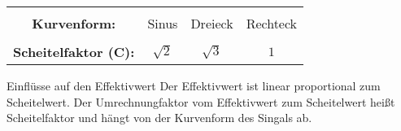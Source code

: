 \begin{frame}
{        \begin{table}[H]
            \centering%
        \begin{tabular}{ c c c c }
            \hline &&&\\[-6pt]
            \textbf{Kurvenform:}
                & Sinus
                & Dreieck
                & Rechteck \\[+4pt]
            \hline &&&\\[-6pt]
            \textbf{Scheitelfaktor (C):}
                & $ \sqrt{2} $ 
                & $ \sqrt{3} $     
                & $ 1 $ \\[+4pt]
            \hline
        \end{tabular}
        \end{table}
    }


\end{frame}


\begin{frame}

    \begin{Merksatz}{Einflüsse auf den Effektivwert}
        Der Effektivwert ist linear proportional zum Scheitelwert. Der Umrechnungfaktor vom Effektivwert zum Scheitelwert 
        heißt Scheitelfaktor und hängt von der Kurvenform des Singals ab. 
    \end{Merksatz}
\end{frame}


